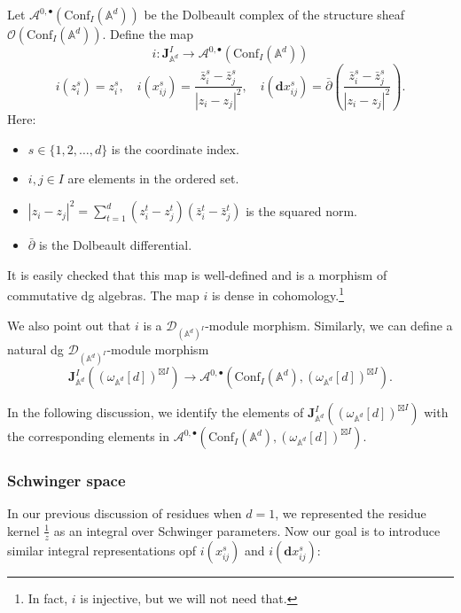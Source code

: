 \documentclass[11pt]{amsart}
\theoremstyle{definition}
\theoremstyle{remark}
\numberwithin{equation}{section}
\begin{document}
Let $\mathcal{A}^{0,\bullet}(\mathrm{Conf}_{ I}(\mathbb{A}^d))$ be the Dolbeault complex of the structure sheaf $\mathcal{O}(\mathrm{Conf}_{ I}(\mathbb{A}^{d}))$. Define the map
$$
i:\mathbf{J}^{ I}_{\mathbb{A}^{d}}\rightarrow\mathcal{A}^{0,\bullet}(\mathrm{Conf}_{ I}(\mathbb{A}^d))
$$
$$
i(z_{i}^{s}) = z_{i}^{s},\quad i(x_{ij}^{s}) = \frac{\bar{z}_{i}^{s} - \bar{z}_{j}^{s}}{|z_{i} - z_{j}|^{2}},\quad i(\mathbf{d}x_{ij}^{s}) = \bar{\partial}\left(\frac{\bar{z}_{i}^{s} - \bar{z}_{j}^{s}}{|z_{i} - z_{j}|^{2}}\right).
$$
Here:
\begin{itemize}
    \item \(s \in \{1,2,\dots,d\}\) is the coordinate index.
    \item \(i, j \in  I\) are elements in the ordered set.
    \item \(|z_{i} - z_{j}|^{2} = \sum\limits_{t=1}^{d}(z_{i}^{t} - z_{j}^{t})(\bar{z}_{i}^{t} - \bar{z}_{j}^{t})\) is the squared norm.
    \item \(\bar{\partial}\) is the Dolbeault differential.
\end{itemize}
It is easily checked that this map is well-defined and is a morphism of commutative dg algebras.
The map $i$ is dense in cohomology.\footnote{In fact, $i$
is injective, but we will not need that.}

We also point out that $i$ is a $\mathcal{D}_{(\mathbb{A}^{d})^{ I}}$-module morphism.
Similarly, we can define a natural dg $\mathcal{D}_{(\mathbb{A}^{d})^{ I}}$-module
morphism
\[
  \mathbf{J}^{ I}_{\mathbb{A}^{d}}((\omega_{\mathbb{A}^{d}}[d])^{\boxtimes I}) \to \mathcal{A}^{0,\bullet}
  (\mathrm{Conf}_{ I}(\mathbb{A}^d),(\omega_{\mathbb{A}^{d}}[d])^{\boxtimes I}) .
\]

In the following discussion, we identify the elements of $\mathbf{J}^{ I}_{\mathbb{A}^{d}}((\omega_{\mathbb{A}^{d}}[d])^{\boxtimes I})$ with the corresponding elements in $\mathcal{A}^{0,\bullet}(\mathrm{Conf}_{ I}(\mathbb{A}^d),(\omega_{\mathbb{A}^{d}}[d])^{\boxtimes I})$.

\subsubsection{Schwinger space}

In our previous discussion of residues when $d=1$, we represented the residue kernel $\frac{1}{z}$ as an integral over Schwinger parameters.
Now our goal is to introduce similar integral representations opf $i(x_{ij}^{s})$ and $i(\mathbf{d}x_{ij}^{s})$:
\end{document}
